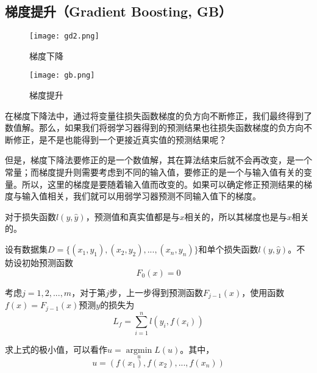 \subsection{梯度提升（Gradient Boosting, GB）}
\begin{figure}[htbp]
	\begin{minipage}[t]{0.4\linewidth}
		\centering
		\texttt{[image: gd2.png]}
		\caption{梯度下降}
	\end{minipage}
	\hfill
	\begin{minipage}[t]{0.4\linewidth}
		\texttt{[image: gb.png]}
		\caption{梯度提升}
	\end{minipage}
\end{figure}
	在梯度下降法中，通过将变量往损失函数梯度的负方向不断修正，我们最终得到了数值解。那么，如果我们将弱学习器得到的预测结果也往损失函数梯度的负方向不断修正，是不是也能得到一个更接近真实值的预测结果呢？\par
	但是，梯度下降法要修正的是一个数值解，其在算法结束后就不会再改变，是一个常量；而梯度提升则需要考虑到不同的输入值，要修正的是一个与输入值有关的变量。所以，这里的梯度是要随着输入值而改变的。如果可以确定修正预测结果的梯度与输入值相关，我们就可以用弱学习器预测不同输入值下的梯度。\par
	对于损失函数$l(y,\hat{y})$，预测值和真实值都是与$x$相关的，所以其梯度也是与$x$相关的。\par
	设有数据集$D=\{(x_1,y_1),(x_2,y_2),...,(x_n,y_n)\}$和单个损失函数$l(y,\hat{y})$。不妨设初始预测函数
\begin{equation}
	F_0(x)=0
\end{equation}\par
	考虑$j=1,2,...,m$，对于第$j$步，上一步得到预测函数$F_{j-1}(x)$，使用函数$f(x)=F_{j-1}(x)$预测$y$的损失为
\begin{equation}
	L_f=\sum\limits_{i=1}^n l(y_i,f(x_i))
\end{equation}\par
	求上式的极小值，可以看作$\hat{u}=\mathop{\arg\min}\limits_u L(u)$。其中，
\begin{equation}
	u=(f(x_1),f(x_2),...,f(x_n))
\end{equation}
